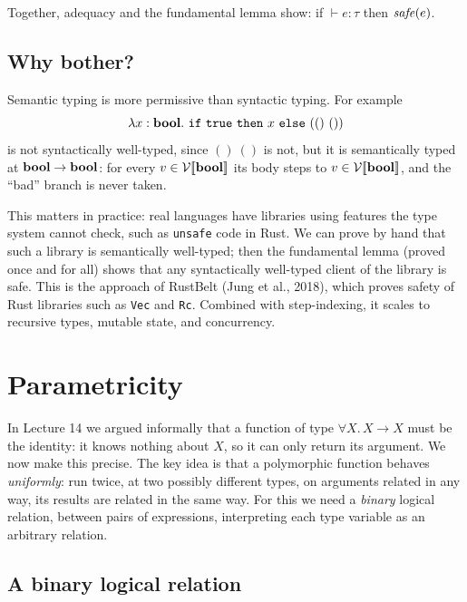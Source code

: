 Together, adequacy and the fundamental lemma show: if $\vdash e : \tau$ then
$\mathit{safe}(e)$.
 
\subsection{Why bother?}
 
Semantic typing is more permissive than syntactic typing. For example
\[
\lambda x : \kw{bool}.\ \ttkw{if}\ \ttkw{true}\ \ttkw{then}\ x\ \ttkw{else}\ (()\ ())
\]
is not syntactically well-typed, since $()\ ()$ is not, but it is semantically typed at
$\mathbf{bool} \to \mathbf{bool}$: for every $v \in \mathcal{V}[\![\mathbf{bool}]\!]$ its body steps to $v \in
\mathcal{V}[\![\mathbf{bool}]\!]$, and the ``bad'' branch is never taken.
 
This matters in practice: real languages have libraries using features the type system
cannot check, such as \texttt{unsafe} code in Rust. We can prove by hand that such a
library is semantically well-typed; then the fundamental lemma (proved once and for
all) shows that any syntactically well-typed client of the library is safe. This is the
approach of RustBelt (Jung et al., 2018), which proves safety of Rust libraries such as
\texttt{Vec} and \texttt{Rc}. Combined with step-indexing, it scales to recursive types,
mutable state, and concurrency.
 
\section{Parametricity}
 
In Lecture 14 we argued informally that a function of type $\forall X.\, X \to X$ must
be the identity: it knows nothing about $X$, so it can only return its argument. We now
make this precise. The key idea is that a polymorphic function behaves \emph{uniformly}:
run twice, at two possibly different types, on arguments related in any way, its
results are related in the same way. For this we need a \emph{binary} logical relation,
between pairs of expressions, interpreting each type variable as an arbitrary relation.
 
\subsection{A binary logical relation}
 
